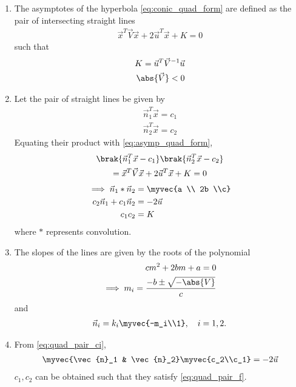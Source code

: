 \renewcommand{\theequation}{\theenumi}
\begin{enumerate}[label=\thesection.\arabic*.,ref=\thesection.\theenumi]

\item The asymptotes of the hyperbola \eqref{eq:conic_quad_form} are defined as the pair of intersecting straight lines 
\begin{align}
\label{eq:asymp_quad_form}
\vec{x}^T\vec{V}\vec{x}+2\vec{u}^T\vec{x}+K=0
\end{align}
such that 
\begin{align} 
\label{eq:quad_form_asymp_cond}
K =  \vec{u}^T\vec{V}^{-1}\vec{u}
\\
\abs{\vec{V}} < 0
\label{eq:quad_pair_det}
\end{align} 
%
\item Let the pair of straight lines be given by 
\begin{align}
\label{eq:quad_pair_lines}
\vec{n}_1^T \vec{x} = c_1
\\
\vec{n}_2^T \vec{x} = c_2
\end{align}
Equating their product with \eqref{eq:asymp_quad_form},
\begin{multline}
\brak{\vec{n}_1^T \vec{x} - c_1}
\brak{\vec{n}_2^T \vec{x} - c_2} 
\\
=
\vec{x}^T\vec{V}\vec{x}+2\vec{u}^T\vec{x}+K=0
\end{multline}
\begin{align}
\implies 
\vec{n}_1 *\vec{n}_2  &= \myvec{a \\ 2b \\c}
\label{eq:quad_pair_conv}
\\
c_2\vec{n}_1 + c_1 \vec{n}_2 &= -2\vec{u}
\label{eq:quad_pair_ci}
\\
c_1 c_2 &= K
\label{eq:quad_pair_f}
\end{align}
%
where $*$ represents convolution.
\item The slopes of the lines are given by the roots of the polynomial
\begin{align}
\label{eq:quad_pair_slopes}
cm^2 + 2bm + a = 0
\\
\implies m_i = \frac{-b \pm \sqrt{-\abs{V}}}{c}
\end{align}
and 
\begin{align}
\label{eq:quad_pair_norm_vec}
\vec{n}_i = k_i\myvec{-m_i\\1}, \quad i = 1,2.
\end{align}
\item From \eqref{eq:quad_pair_ci},
\begin{align}
\label{eq:quad_pair_ci_mat}
\myvec{\vec{n}_1 & \vec{n}_2}\myvec{c_2\\c_1} = -2\vec{u}
\end{align}
$c_1,c_2$ can be obtained such that they satisfy \eqref{eq:quad_pair_f}.

\end{enumerate}
